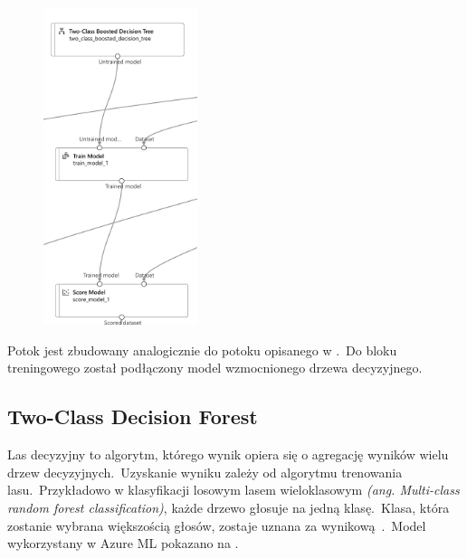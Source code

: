 \begin{figure}[H]
    \centering
    \includegraphics[width=0.4\textwidth]{images/dt_pipe}
    \label{fig:dt-pipe}
\end{figure}

Potok jest zbudowany analogicznie do potoku opisanego w .\ Do bloku treningowego został podłączony model wzmocnionego drzewa decyzyjnego.

\subsection{Two-Class Decision Forest}
Las decyzyjny to algorytm, którego wynik opiera się o agregację wyników wielu drzew decyzyjnych.\ Uzyskanie wyniku zależy od algorytmu trenowania lasu.\ Przykładowo w klasyfikacji losowym lasem wieloklasowym \textit{(ang. Multi-class random forest classification)}, każde drzewo głosuje na jedną klasę.\ Klasa, która zostanie wybrana większością głosów, zostaje uznana za wynikową~\cite{Google}.\ Model wykorzystany w Azure ML pokazano na .

